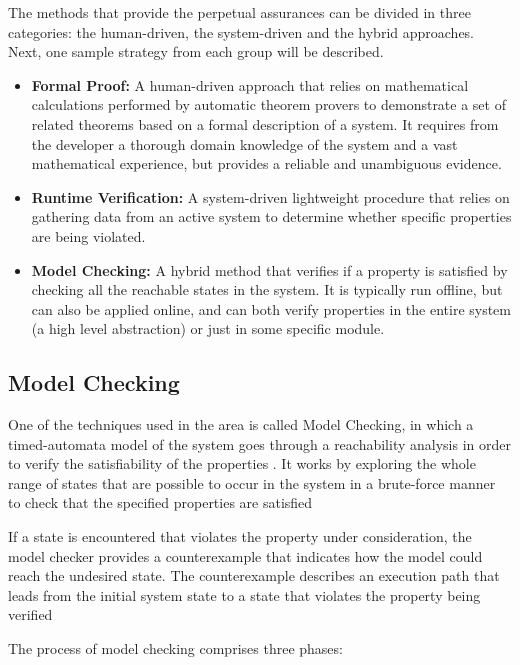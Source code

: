 The methods that provide the perpetual assurances can be divided in three categories: the human-driven, the system-driven and the hybrid approaches. Next, one sample strategy from each group will be described.

\begin{itemize}
    \item \textbf{Formal Proof:} A human-driven approach that relies on mathematical calculations performed by automatic theorem provers to demonstrate a set of related theorems based on a formal description of a system. It requires from the developer a thorough domain knowledge of the system and a vast mathematical experience, but provides a reliable and unambiguous evidence. 
    
	\item \textbf{Runtime Verification:} A system-driven lightweight procedure that relies on gathering data from an active system to determine whether specific properties are being violated.
	
	\item \textbf{Model Checking:} A hybrid method that verifies if a property is satisfied by checking all the reachable states in the system. It is typically run offline, but can also be applied online, and can both verify properties in the entire system (a high level abstraction) or just in some specific module.
    
\end{itemize}


\subsection{Model Checking}

One of the techniques used in the area is called Model Checking, in which a timed-automata model of the system goes through a reachability analysis in order to verify the satisfiability of the properties \cite{2008PrinciplesModelChecking}. It works by exploring the whole range of states that are possible to occur in the system in a brute-force manner to check that the specified properties are satisfied

If a state is encountered that violates the property under consideration, the model checker provides a counterexample that indicates how the model could reach the undesired state. The counterexample describes an execution path that leads from the initial system state to a state that violates the property being verified

The process of model checking comprises three phases: 

